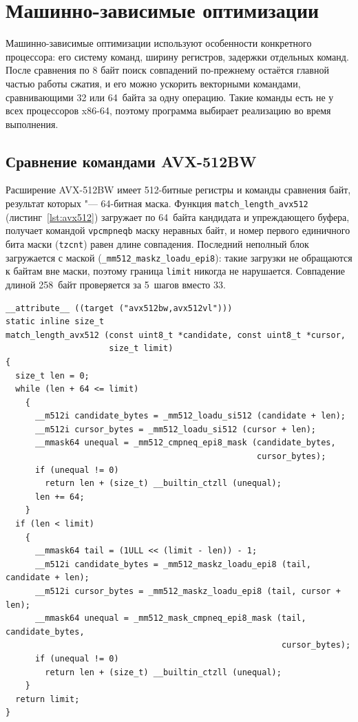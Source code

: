 \chapter{Машинно-зависимые оптимизации}

Машинно-зависимые оптимизации используют особенности конкретного
процессора: его систему команд, ширину регистров, задержки отдельных
команд. После сравнения по 8 байт поиск совпадений
по-прежнему остаётся главной частью работы сжатия, и его можно ускорить
векторными командами, сравнивающими 32 или 64~байта за одну операцию.
Такие команды есть не у всех процессоров x86-64, поэтому программа выбирает
реализацию во время выполнения.

\section{Сравнение командами AVX-512BW}
\label{sec:avx512}

Расширение AVX-512BW имеет 512-битные
регистры и команды сравнения байт, результат которых "--- 64-битная маска.
Функция \texttt{match\_length\_avx512} (листинг~\ref{lst:avx512})
загружает по 64~байта кандидата и упреждающего буфера, получает командой
\texttt{vpcmpneqb} маску неравных байт, и номер первого единичного бита
маски (\texttt{tzcnt}) равен длине совпадения. Последний неполный блок
загружается с маской (\texttt{\_mm512\_maskz\_loadu\_epi8}): такие загрузки не
обращаются к байтам вне маски, поэтому граница \texttt{limit} никогда не
нарушается. Совпадение длиной 258~байт проверяется за 5~шагов вместо 33.

\begin{lstlisting}[caption={Сравнение командами AVX-512BW},label={lst:avx512}]
__attribute__ ((target ("avx512bw,avx512vl")))
static inline size_t
match_length_avx512 (const uint8_t *candidate, const uint8_t *cursor,
                     size_t limit)
{
  size_t len = 0;
  while (len + 64 <= limit)
    {
      __m512i candidate_bytes = _mm512_loadu_si512 (candidate + len);
      __m512i cursor_bytes = _mm512_loadu_si512 (cursor + len);
      __mmask64 unequal = _mm512_cmpneq_epi8_mask (candidate_bytes,
                                                   cursor_bytes);
      if (unequal != 0)
        return len + (size_t) __builtin_ctzll (unequal);
      len += 64;
    }
  if (len < limit)
    {
      __mmask64 tail = (1ULL << (limit - len)) - 1;
      __m512i candidate_bytes = _mm512_maskz_loadu_epi8 (tail, candidate + len);
      __m512i cursor_bytes = _mm512_maskz_loadu_epi8 (tail, cursor + len);
      __mmask64 unequal = _mm512_mask_cmpneq_epi8_mask (tail, candidate_bytes,
                                                        cursor_bytes);
      if (unequal != 0)
        return len + (size_t) __builtin_ctzll (unequal);
    }
  return limit;
}
\end{lstlisting}

